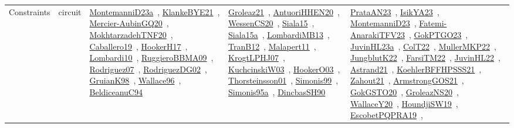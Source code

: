 {\begin{longtable}{lp{3cm}>{\raggedright\arraybackslash}p{6cm}>{\raggedright\arraybackslash}p{6cm}>{\raggedright\arraybackslash}p{8cm}}
Constraints & circuit & \href{../works/MontemanniD23a.pdf}{MontemanniD23a}~\cite{MontemanniD23a}, \href{../works/KlankeBYE21.pdf}{KlankeBYE21}~\cite{KlankeBYE21}, \href{../works/Mercier-AubinGQ20.pdf}{Mercier-AubinGQ20}~\cite{Mercier-AubinGQ20}, \href{../works/MokhtarzadehTNF20.pdf}{MokhtarzadehTNF20}~\cite{MokhtarzadehTNF20}, \href{../works/Caballero19.pdf}{Caballero19}~\cite{Caballero19}, \href{../works/HookerH17.pdf}{HookerH17}~\cite{HookerH17}, \href{../works/Lombardi10.pdf}{Lombardi10}~\cite{Lombardi10}, \href{../works/RuggieroBBMA09.pdf}{RuggieroBBMA09}~\cite{RuggieroBBMA09}, \href{../works/Rodriguez07.pdf}{Rodriguez07}~\cite{Rodriguez07}, \href{../works/RodriguezDG02.pdf}{RodriguezDG02}~\cite{RodriguezDG02}, \href{../works/GruianK98.pdf}{GruianK98}~\cite{GruianK98}, \href{../works/Wallace96.pdf}{Wallace96}~\cite{Wallace96}, \href{../works/BeldiceanuC94.pdf}{BeldiceanuC94}~\cite{BeldiceanuC94} & \href{../works/Groleaz21.pdf}{Groleaz21}~\cite{Groleaz21}, \href{../works/AntuoriHHEN20.pdf}{AntuoriHHEN20}~\cite{AntuoriHHEN20}, \href{../works/WessenCS20.pdf}{WessenCS20}~\cite{WessenCS20}, \href{../works/Siala15.pdf}{Siala15}~\cite{Siala15}, \href{../works/Siala15a.pdf}{Siala15a}~\cite{Siala15a}, \href{../works/LombardiMB13.pdf}{LombardiMB13}~\cite{LombardiMB13}, \href{../works/TranB12.pdf}{TranB12}~\cite{TranB12}, \href{../works/Malapert11.pdf}{Malapert11}~\cite{Malapert11}, \href{../works/KrogtLPHJ07.pdf}{KrogtLPHJ07}~\cite{KrogtLPHJ07}, \href{../works/KuchcinskiW03.pdf}{KuchcinskiW03}~\cite{KuchcinskiW03}, \href{../works/HookerO03.pdf}{HookerO03}~\cite{HookerO03}, \href{../works/Thorsteinsson01.pdf}{Thorsteinsson01}~\cite{Thorsteinsson01}, \href{../works/Simonis99.pdf}{Simonis99}~\cite{Simonis99}, \href{../works/Simonis95a.pdf}{Simonis95a}~\cite{Simonis95a}, \href{../works/DincbasSH90.pdf}{DincbasSH90}~\cite{DincbasSH90} & \href{../works/PrataAN23.pdf}{PrataAN23}~\cite{PrataAN23}, \href{../works/IsikYA23.pdf}{IsikYA23}~\cite{IsikYA23}, \href{../works/MontemanniD23.pdf}{MontemanniD23}~\cite{MontemanniD23}, \href{../works/Fatemi-AnarakiTFV23.pdf}{Fatemi-AnarakiTFV23}~\cite{Fatemi-AnarakiTFV23}, \href{../works/GokPTGO23.pdf}{GokPTGO23}~\cite{GokPTGO23}, \href{../works/JuvinHL23a.pdf}{JuvinHL23a}~\cite{JuvinHL23a}, \href{../works/ColT22.pdf}{ColT22}~\cite{ColT22}, \href{../works/MullerMKP22.pdf}{MullerMKP22}~\cite{MullerMKP22}, \href{../works/JungblutK22.pdf}{JungblutK22}~\cite{JungblutK22}, \href{../works/FarsiTM22.pdf}{FarsiTM22}~\cite{FarsiTM22}, \href{../works/JuvinHL22.pdf}{JuvinHL22}~\cite{JuvinHL22}, \href{../works/Astrand21.pdf}{Astrand21}~\cite{Astrand21}, \href{../works/KoehlerBFFHPSSS21.pdf}{KoehlerBFFHPSSS21}~\cite{KoehlerBFFHPSSS21}, \href{../works/Zahout21.pdf}{Zahout21}~\cite{Zahout21}, \href{../works/ArmstrongGOS21.pdf}{ArmstrongGOS21}~\cite{ArmstrongGOS21}, \href{../works/GokGSTO20.pdf}{GokGSTO20}~\cite{GokGSTO20}, \href{../works/GroleazNS20.pdf}{GroleazNS20}~\cite{GroleazNS20}, \href{../works/WallaceY20.pdf}{WallaceY20}~\cite{WallaceY20}, \href{../works/HoundjiSW19.pdf}{HoundjiSW19}~\cite{HoundjiSW19}, \href{../works/EscobetPQPRA19.pdf}{EscobetPQPRA19}~\cite{EscobetPQPRA19}, 
\end{longtable}}
